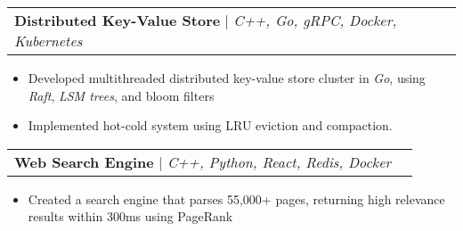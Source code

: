 \documentclass[letterpaper,11pt]{article}
\makeatletter
\newcommand{\resumeItem}[1]{
  \item\small{
    {#1 \vspace{-2pt}}
  }
}
\newcommand{\resumeProjectHeading}[2]{
    \item
    \begin{tabular*}{0.97\textwidth}{l@{\extracolsep{\fill}}r}
      \small#1 & #2 \\
    \end{tabular*}\vspace{-7pt}
}
\newcommand{\resumeItemListStart}{\begin{itemize}}
\newcommand{\resumeItemListEnd}{\end{itemize}\vspace{-5pt}}
\makeatother
\begin{document}
  

        \resumeProjectHeading
          {\textbf{Distributed Key-Value Store} $|$ \emph{C++, Go, gRPC, Docker, Kubernetes}}{}
          \resumeItemListStart
            \resumeItem{Developed multithreaded distributed key-value store cluster in \textit{Go}, using \textit{Raft}, \textit{LSM trees}, and bloom filters}
            \resumeItem{Implemented hot-cold system using LRU eviction and compaction. }
          \resumeItemListEnd

        


        \resumeProjectHeading
          {\textbf{Web Search Engine} $|$ \emph{C++, Python, React, Redis, Docker}}{}
          \resumeItemListStart
            \resumeItem{Created a search engine that parses 55,000+ pages, returning high relevance results within 300ms using PageRank}
          \resumeItemListEnd

\end{document}
